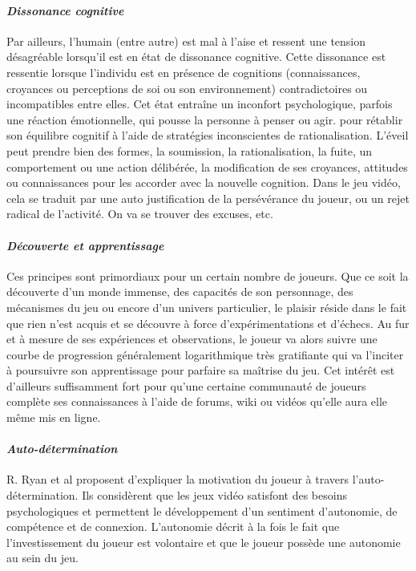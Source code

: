 			\paragraph{\emph{Dissonance cognitive} \\ \quad}
Par ailleurs, l’humain (entre autre) est mal à l’aise et ressent une tension désagréable lorsqu’il est en état de dissonance cognitive. Cette dissonance est ressentie lorsque l’individu est en présence de cognitions (connaissances, croyances ou perceptions de soi ou son environnement) contradictoires ou incompatibles entre elles.
Cet état entraîne un inconfort psychologique, parfois une réaction émotionnelle, qui pousse la personne à penser ou agir. pour rétablir son équilibre cognitif à l’aide de stratégies inconscientes de rationalisation. L’éveil peut prendre bien des formes, la soumission, la rationalisation, la fuite, un comportement ou une action délibérée, la modification de ses croyances, attitudes ou connaissances pour les accorder avec la nouvelle cognition. Dans le jeu vidéo, cela se traduit par une auto justification de la persévérance du joueur, ou un rejet radical de l’activité. On va se trouver des excuses, etc.

			\paragraph{\emph{Découverte et apprentissage}  \\ \quad}
Ces principes sont primordiaux pour un certain nombre de joueurs.  Que ce soit la découverte d’un monde immense, des capacités de son personnage, des mécanismes du jeu ou encore d’un univers particulier, le plaisir réside dans le fait que rien n’est acquis et se découvre à force d’expérimentations et d’échecs. Au fur et à mesure de ses expériences et observations, le joueur va alors suivre une courbe de progression généralement logarithmique très gratifiante qui va l’inciter à poursuivre son apprentissage pour parfaire sa maîtrise du jeu. Cet intérêt est d’ailleurs suffisamment fort pour qu’une certaine communauté de joueurs complète ses connaissances à l’aide de forums, wiki ou vidéos qu’elle aura elle même mis en ligne.

			\paragraph{\emph{Auto-détermination} \\ \quad}
R. Ryan et al\cite{Ryan00} proposent d’expliquer la motivation du joueur à travers l’auto-détermination. Ils considèrent que les jeux vidéo satisfont des besoins psychologiques et permettent le développement d’un sentiment d’autonomie, de compétence et de connexion. L’autonomie décrit à la fois le fait que l’investissement du joueur est volontaire et que le joueur possède une autonomie au sein du jeu.


